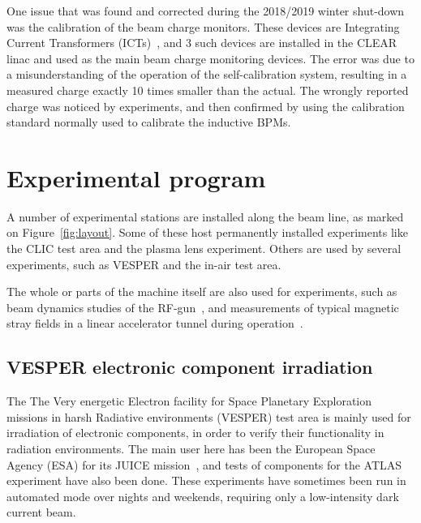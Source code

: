 \documentclass[a4paper,
               keeplastbox,   %
               ]{jacow}
\begin{document}
One issue that was found and corrected during the  2018/2019 winter shut-down was the calibration of the beam charge monitors.
These devices are Integrating Current Transformers (ICTs)~\cite{BergozICT}, and 3 such devices are installed in the CLEAR linac and used as the main beam charge monitoring devices.
The error was due to a misunderstanding of the operation of the self-calibration system, resulting in a measured charge exactly 10 times smaller than the actual.
The wrongly reported charge was noticed by experiments, and then confirmed by using the calibration standard normally used to calibrate the inductive BPMs.

\section{Experimental program}
A number of experimental stations are installed along the beam line, as marked on Figure~\ref{fig:layout}.
Some of these host permanently installed experiments like the CLIC test area and the plasma lens experiment.
Others are used by several experiments, such as VESPER and the in-air test area.

The whole or parts of the machine itself are also used for experiments, such as beam dynamics studies of the RF-gun~\cite{LucaGun}, and measurements of typical magnetic stray fields in a linear accelerator tunnel during operation~\cite{Gohil:IPAC19-MOPGW081}.

\subsection{VESPER electronic component irradiation}
The The Very energetic Electron facility for Space Planetary Exploration missions in harsh Radiative environments (VESPER) test area is mainly used for irradiation of electronic components, in order to verify their functionality in radiation environments.
The main user here has been the European Space Agency (ESA) for its JUICE mission~\cite{MarisTali:E-SEU,MarisTali:E-SEL,RubenAlia::CLEARrev}, and tests of components for the ATLAS experiment have also been done.
These experiments have sometimes been run in automated mode over nights and weekends, requiring only a low-intensity dark current beam.
\end{document}
